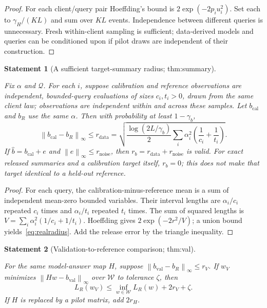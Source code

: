 \documentclass[11pt]{article}
\newtheorem{statement}{Statement}
\newcommand{\Q}{\mathcal Q}\newcommand{\Z}{\mathcal Z}\newcommand{\W}{\mathcal W}
\newcommand{\norm}[1]{\left\lVert#1\right\rVert}\newcommand{\qh}{\widehat H}
\newcommand{\bh}{\widehat b}\newcommand{\calL}{\mathcal L}\newcommand{\eps}{\varepsilon}
\begin{document}
\begin{proof}
For each client/query pair Hoeffding's bound is $2\exp(-2p_i u_i^2)$. Set each to $\gamma_H/(KL)$ and sum over $KL$ events. Independence between different queries is unnecessary. Fresh within-client sampling is sufficient; data-derived models and queries can be conditioned upon if pilot draws are independent of their construction.
\end{proof}

\begin{statement}[A sufficient target-summary radius; thm:summary]\label{thm:summary}

Fix $\alpha$ and $\Q$. For each $i$, suppose calibration and reference observations are independent, bounded-query evaluations of sizes $c_i,t_i>0$, drawn from the same client law; observations are independent within and across these samples. Let $b_{\mathrm{cal}}$ and $b_R$ use the same $\alpha$. Then with probability at least $1-\gamma_b$,
\begin{equation}\label{eq:realradius}
\norm{b_{\mathrm{cal}}-b_R}_\infty
\le r_{\mathrm{data}}=
\sqrt{\frac{\log(2L/\gamma_b)}{2}
\sum_i\alpha_i^2\left(\frac1{c_i}+\frac1{t_i}\right)}.
\end{equation}
If $\bh=b_{\mathrm{cal}}+e$ and $\norm e_\infty\le r_{\mathrm{noise}}$, then $r_b=r_{\mathrm{data}}+r_{\mathrm{noise}}$ is valid. For exact released summaries and a calibration target itself, $r_b=0$; this does not make that target identical to a held-out reference.

\end{statement}

\begin{proof}
For each query, the calibration-minus-reference mean is a sum of independent mean-zero bounded variables. Their interval lengths are $\alpha_i/c_i$ repeated $c_i$ times and $\alpha_i/t_i$ repeated $t_i$ times. The sum of squared lengths is $V=\sum_i\alpha_i^2(1/c_i+1/t_i)$. Hoeffding gives $2\exp(-2r^2/V)$; a union bound yields~\eqref{eq:realradius}. Add the release error by the triangle inequality.
\end{proof}

\begin{statement}[Validation-to-reference comparison; thm:val]\label{thm:val}

For the same model-answer map $H$, suppose $\norm{b_{\mathrm{val}}-b_R}_\infty\le r_V$. If $w_V$ minimizes $\norm{Hw-b_{\mathrm{val}}}_\infty$ over $\W$ to tolerance $\zeta$, then
\begin{equation}
L_R(w_V)\le\inf_{w\in\W}L_R(w)+2r_V+\zeta.
\end{equation}
If $H$ is replaced by a pilot matrix, add $2r_H$.

\end{statement}
\end{document}
